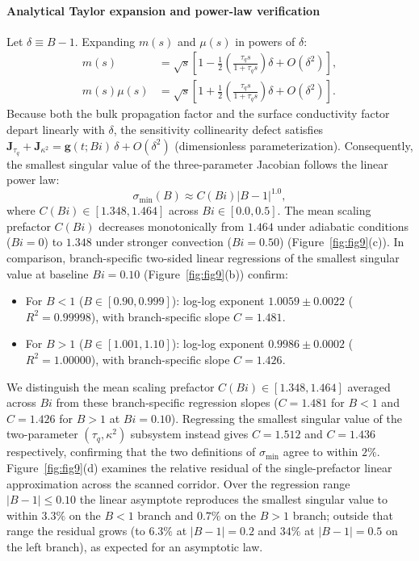 \documentclass[preprint,12pt]{elsarticle}
\begin{document}
\paragraph{Analytical Taylor expansion and power-law verification}
Let $\delta \equiv B - 1$. Expanding $m(s)$ and $\mu(s)$ in powers of $\delta$:
\begin{align}
m(s) &= \sqrt{s} \left[ 1 - \frac{1}{2}\left(\frac{\tau_q s}{1 + \tau_q s}\right) \delta + O(\delta^2) \right], \\
m(s)\mu(s) &= \sqrt{s} \left[ 1 + \frac{1}{2}\left(\frac{\tau_q s}{1 + \tau_q s}\right) \delta + O(\delta^2) \right].
\end{align}
Because both the bulk propagation factor and the surface conductivity factor depart linearly with $\delta$, the sensitivity collinearity defect satisfies $\bm{J}_{\tau_q} + \bm{J}_{\kappa^2} = \bm{g}(t; Bi) \, \delta + O(\delta^2)$ (dimensionless parameterization). Consequently, the smallest singular value of the three-parameter Jacobian follows the linear power law:
\begin{equation}
\sigma_{\min}(B) \approx C(Bi) |B - 1|^{1.0},
\label{eq:scaling_law}
\end{equation}
where $C(Bi) \in [1.348, 1.464]$ across $Bi \in [0.0, 0.5]$. The mean scaling prefactor $C(Bi)$ decreases monotonically from $1.464$ under adiabatic conditions ($Bi = 0$) to $1.348$ under stronger convection ($Bi = 0.50$) (Figure~\ref{fig:fig9}(c)). In comparison, branch-specific two-sided linear regressions of the smallest singular value at baseline $Bi = 0.10$ (Figure~\ref{fig:fig9}(b)) confirm:
\begin{itemize}
    \item For $B < 1$ ($B \in [0.90, 0.999]$): log-log exponent $1.0059 \pm 0.0022$ ($R^2 = 0.99998$), with branch-specific slope $C = 1.481$.
    \item For $B > 1$ ($B \in [1.001, 1.10]$): log-log exponent $0.9986 \pm 0.0002$ ($R^2 = 1.00000$), with branch-specific slope $C = 1.426$.
\end{itemize}
We distinguish the mean scaling prefactor $C(Bi) \in [1.348, 1.464]$ averaged across $Bi$ from these branch-specific regression slopes ($C = 1.481$ for $B < 1$ and $C = 1.426$ for $B > 1$ at $Bi = 0.10$). Regressing the smallest singular value of the two-parameter $(\tau_q, \kappa^2)$ subsystem instead gives $C = 1.512$ and $C = 1.436$ respectively, confirming that the two definitions of $\sigma_{\min}$ agree to within $2\%$. Figure~\ref{fig:fig9}(d) examines the relative residual of the single-prefactor linear approximation across the scanned corridor. Over the regression range $|B - 1| \le 0.10$ the linear asymptote reproduces the smallest singular value to within $3.3\%$ on the $B < 1$ branch and $0.7\%$ on the $B > 1$ branch; outside that range the residual grows (to $6.3\%$ at $|B-1| = 0.2$ and $34\%$ at $|B-1| = 0.5$ on the left branch), as expected for an asymptotic law.
\end{document}
